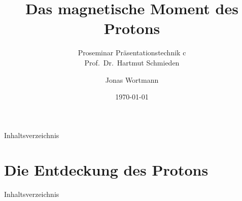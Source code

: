 \documentclass[t,9pt]{beamer}
\title[\thesection]{Das magnetische Moment des Protons}
\subtitle{Proseminar Präsentationstechnik c \\\tiny Prof.\ Dr.\ Hartmut Schmieden}
\author{Jonas Wortmann}
\institute{Universität Bonn}
\date{\today}
\begin{document}

        \begin{frame}
                \titlepage
        \end{frame}

        \begin{frame}{Inhaltsverzeichnis}
                \tableofcontents
        \end{frame}

        \section{Die Entdeckung des Protons}

        \begin{frame}{Inhaltsverzeichnis}
                \tableofcontents[currentsection]
        \end{frame}
\end{document}

